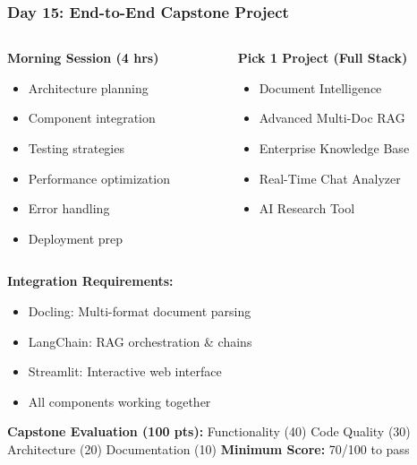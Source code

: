 \begin{frame}[fragile]\frametitle{Day 15: End-to-End Capstone Project}
\begin{columns}
    \begin{column}[T]{0.5\linewidth}
      \textbf{Morning Session (4 hrs)}
      \begin{itemize}
        \item Architecture planning
        \item Component integration
        \item Testing strategies
        \item Performance optimization
        \item Error handling
        \item Deployment prep
      \end{itemize}
    \end{column}
    \begin{column}[T]{0.5\linewidth}
      \textbf{Pick 1 Project (Full Stack)}
      \begin{itemize}
        \item Document Intelligence
        \item Advanced Multi-Doc RAG
        \item Enterprise Knowledge Base
        \item Real-Time Chat Analyzer
        \item AI Research Tool
      \end{itemize}
    \end{column}
  \end{columns}
  
\textbf{Integration Requirements:}
\begin{itemize}
  \item Docling: Multi-format document parsing
  \item LangChain: RAG orchestration \& chains
  \item Streamlit: Interactive web interface
  \item All components working together
\end{itemize}

\textbf{Capstone Evaluation (100 pts):}
Functionality (40) \textbar Code Quality (30) \textbar Architecture (20) \textbar Documentation (10)
\textbf{Minimum Score:} 70/100 to pass
\end{frame}

